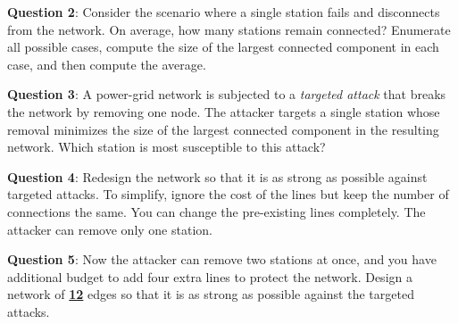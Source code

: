 \documentclass[a4paper, 17pt]{extarticle}
\begin{document}
{\bf Question 2}:
Consider the scenario where a single station fails and disconnects from the network. On average, how many stations remain connected? Enumerate all possible cases, compute the size of the largest connected component in each case, and then compute the average.

\clearpage

{\bf Question 3}:
A power-grid network is subjected to a \textit{targeted attack} that breaks the network by removing one node. The attacker targets a single station whose removal minimizes the size of the largest connected component in the resulting network.
Which station is most susceptible to this attack?

{\bf Question 4}:
Redesign the network so that it is as strong as possible against targeted attacks.
To simplify, ignore the cost of the lines but keep the number of connections the same. You can change the pre-existing lines completely. The attacker can remove only one station.

\clearpage

{\bf Question 5}:
Now the attacker can remove two stations at once, and you have additional budget to add four extra lines to protect the network.
Design a network of \underline{\textbf{12}} edges so that it is as strong as possible against the targeted attacks.
\end{document}
